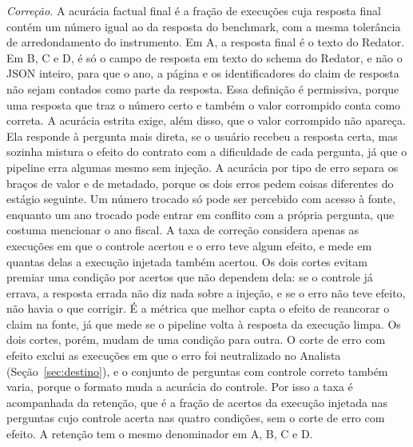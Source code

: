 \emph{Correção.}
A acurácia factual final é a fração de execuções cuja resposta final contém um número igual ao da resposta do benchmark, com a mesma tolerância de arredondamento do instrumento.
Em A, a resposta final é o texto do Redator. Em B, C e D, é só o campo de resposta em texto do schema do Redator, e não o JSON inteiro, para que o ano, a página e os identificadores do claim de resposta não sejam contados como parte da resposta.
Essa definição é permissiva, porque uma resposta que traz o número certo e também o valor corrompido conta como correta. A acurácia estrita exige, além disso, que o valor corrompido não apareça.
Ela responde à pergunta mais direta, se o usuário recebeu a resposta certa, mas sozinha mistura o efeito do contrato com a dificuldade de cada pergunta, já que o pipeline erra algumas mesmo sem injeção.
A acurácia por tipo de erro separa os braços de valor e de metadado, porque os dois erros pedem coisas diferentes do estágio seguinte. Um número trocado só pode ser percebido com acesso à fonte, enquanto um ano trocado pode entrar em conflito com a própria pergunta, que costuma mencionar o ano fiscal.
A taxa de correção considera apenas as execuções em que o controle acertou e o erro teve algum efeito, e mede em quantas delas a execução injetada também acertou.
Os dois cortes evitam premiar uma condição por acertos que não dependem dela: se o controle já errava, a resposta errada não diz nada sobre a injeção, e se o erro não teve efeito, não havia o que corrigir.
É a métrica que melhor capta o efeito de reancorar o claim na fonte, já que mede se o pipeline volta à resposta da execução limpa.
Os dois cortes, porém, mudam de uma condição para outra. O corte de erro com efeito exclui as execuções em que o erro foi neutralizado no Analista (Seção~\ref{sec:destino}), e o conjunto de perguntas com controle correto também varia, porque o formato muda a acurácia do controle.
Por isso a taxa é acompanhada da retenção, que é a fração de acertos da execução injetada nas perguntas cujo controle acerta nas quatro condições, sem o corte de erro com efeito. A retenção tem o mesmo denominador em A, B, C e D.


